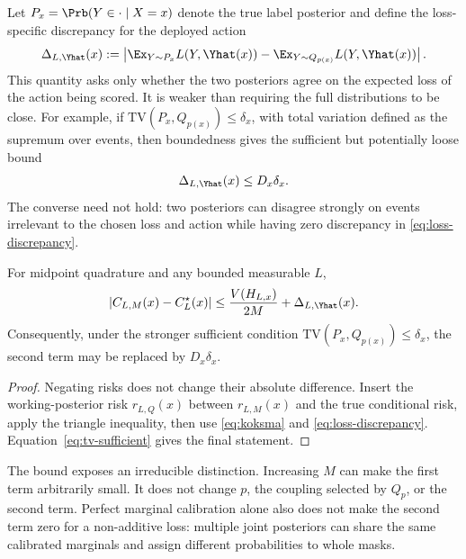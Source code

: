 Let $P_x=\Prb(Y\in\cdot\mid X=x)$ denote the true label posterior and define the
loss-specific discrepancy for the deployed action
\begin{equation}\label{eq:loss-discrepancy}
  \Delta_{L,\Yhat}(x)
  :=\left|
  \Ex_{Y\sim P_x}L(Y,\Yhat(x))
  -\Ex_{Y\sim Q_{p(x)}}L(Y,\Yhat(x))
  \right|.
\end{equation}
This quantity asks only whether the two posteriors agree on the expected loss of the
action being scored. It is weaker than requiring the full distributions to be close.
For example, if
$\mathrm{TV}(P_x,Q_{p(x)})\leq\delta_x$, with total variation defined as the
supremum over events, then boundedness gives the sufficient but potentially loose
bound
\begin{equation}\label{eq:tv-sufficient}
  \Delta_{L,\Yhat}(x)\leq D_x\delta_x.
\end{equation}
The converse need not hold: two posteriors can disagree strongly on events irrelevant
to the chosen loss and action while having zero discrepancy in
\eqref{eq:loss-discrepancy}.

\begin{proposition}\label{prop:total-bound}
For midpoint quadrature and any bounded measurable $L$,
\begin{equation}\label{eq:decomp}
  \left|C_{L,M}(x)-C_L^\star(x)\right|
  \leq
  \frac{V(H_{L,x})}{2M}
  +\Delta_{L,\Yhat}(x).
\end{equation}
Consequently, under the stronger sufficient condition
$\mathrm{TV}(P_x,Q_{p(x)})\leq\delta_x$, the second term may be replaced by
$D_x\delta_x$.
\end{proposition}
\begin{proof}
Negating risks does not change their absolute difference. Insert the
working-posterior risk $r_{L,Q}(x)$ between $r_{L,M}(x)$ and the true conditional
risk, apply the triangle inequality, then use \eqref{eq:koksma} and
\eqref{eq:loss-discrepancy}. Equation~\eqref{eq:tv-sufficient} gives the final
statement.
\end{proof}

The bound exposes an irreducible distinction. Increasing $M$ can make the first term
arbitrarily small. It does not change $p$, the coupling selected by $Q_p$, or the
second term. Perfect marginal calibration alone also does not make the second term
zero for a non-additive loss: multiple joint posteriors can share the same calibrated
marginals and assign different probabilities to whole masks.

